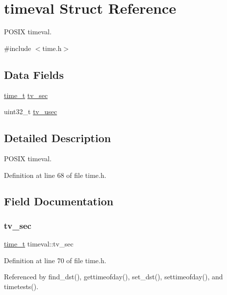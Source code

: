 \hypertarget{structtimeval}{}\section{timeval Struct Reference}
\label{structtimeval}


P\+O\+S\+IX timeval.  




{\ttfamily \#include $<$time.\+h$>$}

\subsection*{Data Fields}
\begin{DoxyCompactItemize}
\item 
\hyperlink{time_8h_a3346b04b0420b32ccf6b706551b70762}{time\+\_\+t} \hyperlink{structtimeval_aef6ddab1064c430758f9f913b7e4a21e}{tv\+\_\+sec}
\item 
uint32\+\_\+t \hyperlink{structtimeval_a8fd7abf5420981b3ff58bb23df458587}{tv\+\_\+usec}
\end{DoxyCompactItemize}


\subsection{Detailed Description}
P\+O\+S\+IX timeval. 

Definition at line 68 of file time.\+h.



\subsection{Field Documentation}
\mbox{\label{structtimeval_aef6ddab1064c430758f9f913b7e4a21e}} 
\subsubsection{\texorpdfstring{tv\+\_\+sec}{tv\_sec}}
{\footnotesize\ttfamily \hyperlink{time_8h_a3346b04b0420b32ccf6b706551b70762}{time\+\_\+t} timeval\+::tv\+\_\+sec}



Definition at line 70 of file time.\+h.



Referenced by find\+\_\+dst(), gettimeofday(), set\+\_\+dst(), settimeofday(), and timetests().

